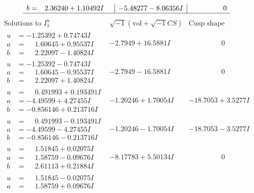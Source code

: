 \documentclass[1p]{elsarticle_modified}
\theoremstyle{definition}
\newcommand{\I}{\sqrt{-1}}
\begin{document}
$$\begin{array}{c|c|c}
\begin{aligned}
b &= \phantom{-}2.36240 + 1.10492 I\end{aligned}
 & -5.48277 - 8.06356 I & \phantom{-0.000000 } 0\\
 \hline 
 \end{array}$$\newpage$$\begin{array}{c|c|c}  
\text{Solutions to }I^u_{1}& \I (\text{vol} + \sqrt{-1}CS) & \text{Cusp shape}\\
 \hline 
\begin{aligned}
u &= -1.25392 + 0.74743 I \\
a &= \phantom{-}1.60645 + 0.95537 I \\
b &= \phantom{-}2.22097 - 1.40824 I\end{aligned}
 & -2.7949 + 16.5881 I & \phantom{-0.000000 } 0 \\ \hline\begin{aligned}
u &= -1.25392 - 0.74743 I \\
a &= \phantom{-}1.60645 - 0.95537 I \\
b &= \phantom{-}2.22097 + 1.40824 I\end{aligned}
 & -2.7949 - 16.5881 I & \phantom{-0.000000 } 0 \\ \hline\begin{aligned}
u &= \phantom{-}0.491993 + 0.193491 I \\
a &= -4.49599 + 4.27455 I \\
b &= -0.856146 + 0.213716 I\end{aligned}
 & -1.20246 + 1.70054 I & -18.7053 + 3.5277 I \\ \hline\begin{aligned}
u &= \phantom{-}0.491993 - 0.193491 I \\
a &= -4.49599 - 4.27455 I \\
b &= -0.856146 - 0.213716 I\end{aligned}
 & -1.20246 - 1.70054 I & -18.7053 - 3.5277 I \\ \hline\begin{aligned}
u &= \phantom{-}1.51845 + 0.02075 I \\
a &= \phantom{-}1.58759 - 0.09676 I \\
b &= \phantom{-}2.61113 + 0.21884 I\end{aligned}
 & -8.17783 + 5.50134 I & \phantom{-0.000000 } 0 \\ \hline\begin{aligned}
u &= \phantom{-}1.51845 - 0.02075 I \\
a &= \phantom{-}1.58759 + 0.09676 I \\

\end{aligned}
\end{array}$$
\end{document}
